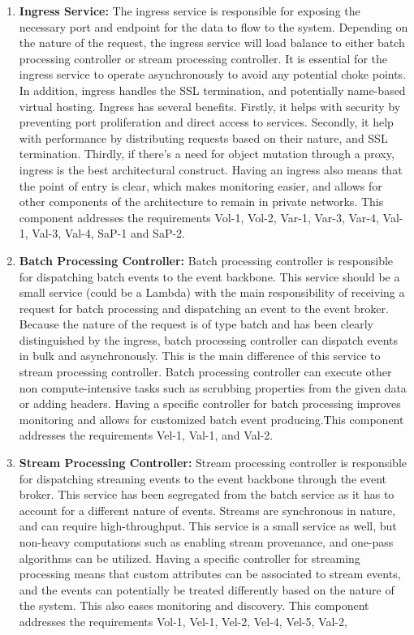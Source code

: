 \documentclass[review]{elsarticle}
\begin{document}
\begin{enumerate}
    \item \textbf{Ingress Service:} The ingress service is responsible for exposing the necessary port and endpoint for the data to flow to the system. Depending on the nature of the request, the ingress service will load balance to either batch processing controller or stream processing controller. It is essential for the ingress service to operate asynchronously to avoid any potential choke points. In addition, ingress handles the SSL termination, and potentially name-based virtual hosting. Ingress has several benefits. Firstly, it helps with security by preventing port proliferation and direct access to services. Secondly, it help with performance by distributing requests based on their nature, and SSL termination. Thirdly, if there's a need for object mutation through a proxy, ingress is the best architectural construct. Having an ingress also means that the point of entry is clear, which makes monitoring easier, and allows for other components of the architecture to remain in private networks. This component addresses the
    requirements Vol-1, Vol-2, Var-1, Var-3, Var-4, Val-1,
    Val-3, Val-4, SaP-1 and SaP-2.
    \item \textbf{Batch Processing Controller:} Batch processing controller is responsible for dispatching batch events to the event backbone. This service should be a small service (could be a Lambda) with the main responsibility of receiving a request for batch processing and dispatching an event to the event broker. Because the nature of the request is of type batch and has been clearly distinguished by the ingress, batch processing controller can dispatch events in bulk and asynchronously. This is the main difference of this service to stream processing controller. Batch processing controller can execute other non compute-intensive tasks such as scrubbing properties from the given data or adding headers. Having a specific controller for batch processing improves monitoring and allows for customized batch event producing.This component addresses the requirements Vel-1, Val-1, and Val-2.
    \item \textbf{Stream Processing Controller:} Stream processing controller is responsible for dispatching streaming events to the event backbone through the event broker. This service has been segregated from the batch service as it has to account for a different nature of events. Streams are synchronous in nature, and can require high-throughput. This service is a small service as well, but non-heavy computations such as enabling stream provenance, and one-pass algorithms can be utilized. Having a specific controller for streaming processing means that custom attributes can be associated to stream events, and the events can potentially be treated differently based on the nature of the system. This also eases monitoring and discovery. This component addresses the requirements Vol-1, Vel-1, Vel-2, Vel-4, Vel-5, Val-2,

\end{enumerate}
\end{document}
